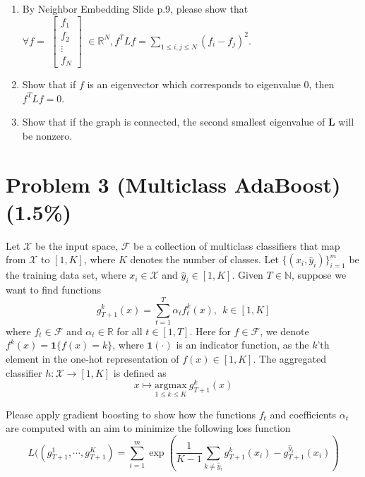 \documentclass{article}
\begin{document}
\begin{enumerate}
\item By Neighbor Embedding Slide p.9, please show that \\
$ \forall f =$
$\begin{bmatrix}
   f_1 \\
   f_2 \\
   \vdots \\
   f_N
\end{bmatrix}$
$\in \mathbb{R}^N, f^T L f=\sum\limits_{1 \leq i,j \leq N}(f_i-f_j)^2$.
\item Show that if $f$ is an eigenvector which corresponds to eigenvalue 0, then $f^T L f=0$.
\item Show that if the graph is connected, the second smallest eigenvalue 
 of $\boldsymbol{L}$ will be nonzero.

\end{enumerate}



\section*{Problem 3 (Multiclass AdaBoost)(1.5\%)}
Let $\mathcal{X}$ be the input space, $\mathscr F$ be a collection of multiclass classifiers that map from $\mathcal{X}$ to $[1, K]$, where $K$ denotes the number of classes.  Let $\{(x_i,{\hat y}_i)\}_{i=1}^m$ be the training data set, where $x_i \in \mathcal{X}$ and ${\hat y}_i \in [1,K]$.  Given $T \in \mathbb{N}$, suppose we want to find functions 
\begin{equation*}
g_{T+1}^k(x) = \sum_{t=1}^T \alpha_t f_t^k(x), ~~ k \in [ 1,K ]
\end{equation*}
where $f_t \in \mathscr F$ and $\alpha_t \in \mathbb{R}$ for all $t \in [1, T]$. Here for $f \in \mathscr F$, we denote $f^k(x) = \mathbf{1}\{f(x) = k\}$, where $\mathbf{1}(\cdot)$ is an indicator function, as the $k$'th element in the one-hot representation of $f(x) \in [ 1,K ]$. The aggregated classifier $h: \mathcal{X} \rightarrow [ 1,K ]$ is defined as
\begin{equation*}
x \mapsto \underset{1 \leq k \leq K}{\mbox{argmax}} ~ g_{T+1}^k(x)
\end{equation*}

Please apply gradient boosting to show how the functions $f_t$ and coefficients $\alpha_t$ are computed with an aim to minimize the following loss function
\begin{equation*}
L((g_{T+1}^1, \cdots, g_{T+1}^K) = \sum_{i=1}^m \exp\left(\frac{1}{K-1}\sum_{k \neq {\hat y}_i} g_{T+1}^{k}(x_i) - g_{T+1}^{{\hat y}_i}(x_i) \right)
\end{equation*}
\end{document}
